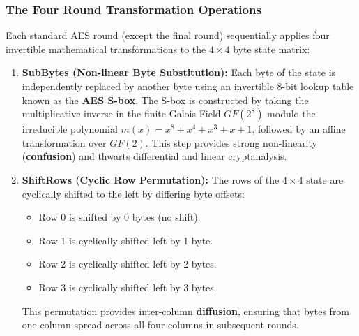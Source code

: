 \subsubsection{The Four Round Transformation Operations}

Each standard AES round (except the final round) sequentially applies four invertible mathematical transformations to the $4 \times 4$ byte state matrix:

\begin{enumerate}
\item \textbf{SubBytes (Non-linear Byte Substitution):}
Each byte of the state is independently replaced by another byte using an invertible 8-bit lookup table known as the \textbf{AES S-box}. The S-box is constructed by taking the multiplicative inverse in the finite Galois Field $GF(2^8)$ modulo the irreducible polynomial $m(x) = x^8 + x^4 + x^3 + x + 1$, followed by an affine transformation over $GF(2)$. This step provides strong non-linearity (\textbf{confusion}) and thwarts differential and linear cryptanalysis.

\item \textbf{ShiftRows (Cyclic Row Permutation):}
The rows of the $4 \times 4$ state are cyclically shifted to the left by differing byte offsets:
\begin{itemize}
\item Row 0 is shifted by 0 bytes (no shift).
\item Row 1 is cyclically shifted left by 1 byte.
\item Row 2 is cyclically shifted left by 2 bytes.
\item Row 3 is cyclically shifted left by 3 bytes.
\end{itemize}
This permutation provides inter-column \textbf{diffusion}, ensuring that bytes from one column spread across all four columns in subsequent rounds.


\end{enumerate}

